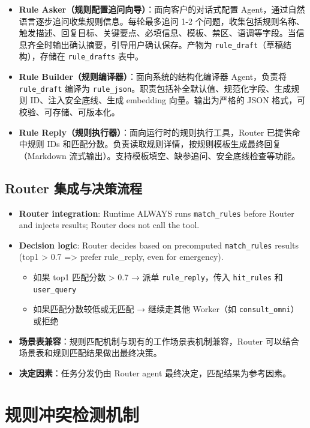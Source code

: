 \documentclass[UTF8]{ctexart}
\begin{document}
\begin{itemize}
    \item \textbf{Rule Asker（规则配置追问向导）}：面向客户的对话式配置 Agent，通过自然语言逐步追问收集规则信息。每轮最多追问 1-2 个问题，收集包括规则名称、触发描述、回复目标、关键要点、必填信息、模板、禁区、语调等字段。当信息齐全时输出确认摘要，引导用户确认保存。产物为 \texttt{rule\_draft}（草稿结构），存储在 \texttt{rule\_drafts} 表中。
    \item \textbf{Rule Builder（规则编译器）}：面向系统的结构化编译器 Agent，负责将 \texttt{rule\_draft} 编译为 \texttt{rule\_json}。职责包括补全默认值、规范化字段、生成规则 ID、注入安全底线、生成 embedding 向量。输出为严格的 JSON 格式，可校验、可存储、可版本化。
    \item \textbf{Rule Reply（规则执行器）}：面向运行时的规则执行工具，Router 已提供命中规则 IDs 和匹配分数。负责读取规则详情，按规则模板生成最终回复（Markdown 流式输出）。支持模板填空、缺参追问、安全底线检查等功能。
\end{itemize}

\subsection{Router 集成与决策流程}

\begin{itemize}
    \item \textbf{Router integration}: Runtime ALWAYS runs \texttt{match\_rules} before Router and injects results; Router does not call the tool.
    \item \textbf{Decision logic}: Router decides based on precomputed \texttt{match\_rules} results (top1 > 0.7 => prefer rule\_reply, even for emergency).
    \begin{itemize}
        \item 如果 top1 匹配分数 > 0.7 → 派单 \texttt{rule\_reply}，传入 \texttt{hit\_rules} 和 \texttt{user\_query}
        \item 如果匹配分数较低或无匹配 → 继续走其他 Worker（如 \texttt{consult\_omni}）或拒绝
    \end{itemize}
    \item \textbf{场景表兼容}：规则匹配机制与现有的工作场景表机制兼容，Router 可以结合场景表和规则匹配结果做出最终决策。
    \item \textbf{决定因素}：任务分发仍由 Router agent 最终决定，匹配结果为参考因素。
\end{itemize}

\section{规则冲突检测机制}
\end{document}
